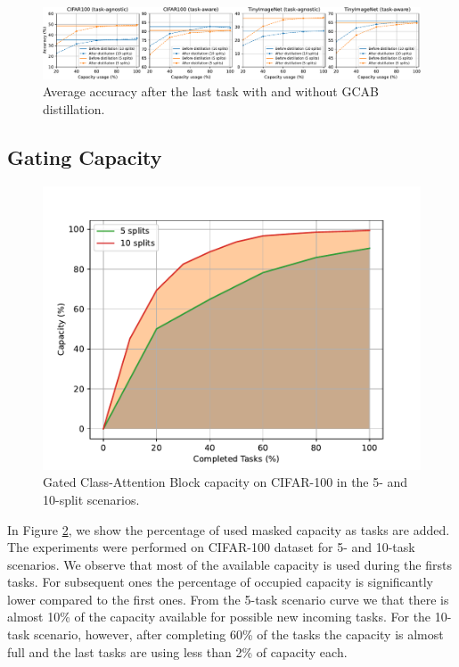 \documentclass[twocolumn]{svjour3}          %
\begin{document}
\begin{figure}[tb]
\begin{center}
\includegraphics[width=\linewidth]{images/dis.pdf}
\end{center}
\caption{Average accuracy after the last task with and without GCAB distillation.}
\label{fig:dis_res}
\end{figure}


\subsection{Gating Capacity}

\begin{figure}[tb]
    \centering
    \includegraphics[scale=0.55]{images/compression.pdf}
    \caption{Gated Class-Attention Block capacity on CIFAR-100 in the 5- and 10-split scenarios. }
    \label{fig:compression}
\end{figure}
In Figure \ref{fig:compression}, we show the percentage of used masked capacity as tasks are added. The experiments were performed on CIFAR-100 dataset for 5- and 10-task scenarios. We observe that most of the available capacity is used during the firsts tasks. For subsequent ones the percentage of occupied capacity is significantly lower compared to the first ones. From the 5-task scenario curve we that there is almost 10\% of the capacity available for possible new incoming tasks. For the 10-task scenario, however, after completing 60\% of the tasks the capacity is almost full and the last tasks are using less than 2\% of capacity each.
\end{document}
